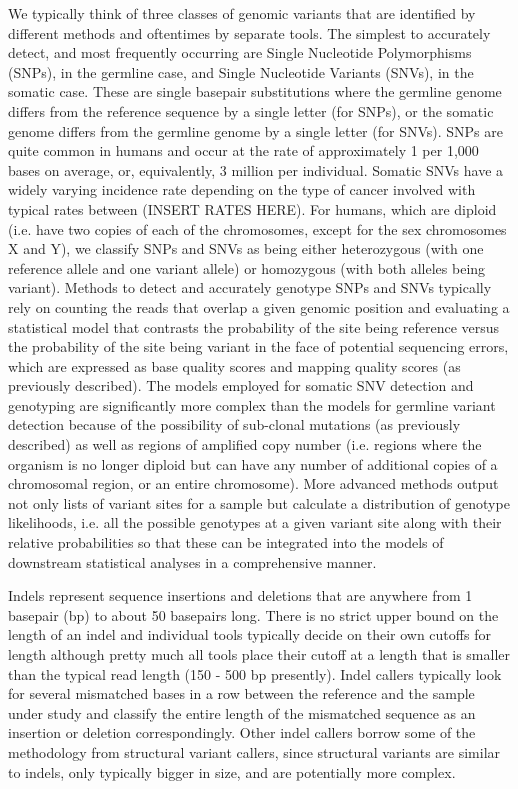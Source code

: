 We typically think of three classes of genomic variants that are identified by different methods and oftentimes by separate tools. The simplest to accurately detect, and most frequently occurring are Single Nucleotide Polymorphisms (SNPs), in the germline case, and Single Nucleotide Variants (SNVs), in the somatic case. These are single basepair substitutions where the germline genome differs from the reference sequence by a single letter (for SNPs), or the somatic genome differs from the germline genome by a single letter (for SNVs). SNPs are quite common in humans and occur at the rate of approximately 1 per 1,000 bases on average, or, equivalently, 3 million per individual. Somatic SNVs have a widely varying incidence rate depending on the type of cancer involved with typical rates between (INSERT RATES HERE). For humans, which are diploid (i.e. have two copies of each of the chromosomes, except for the sex chromosomes X and Y), we classify SNPs and SNVs as being either heterozygous (with one reference allele and one variant allele) or homozygous (with both alleles being variant). Methods to detect and accurately genotype SNPs and SNVs typically rely on counting the reads that overlap a given genomic position and evaluating a statistical model that contrasts the probability of the site being reference versus the probability of the site being variant in the face of potential sequencing errors, which are expressed as base quality scores and mapping quality scores (as previously described)\autocite{nielsen2011genotype}. The models employed for somatic SNV detection and genotyping are significantly more complex than the models for germline variant detection because of the possibility of sub-clonal mutations (as previously described) as well as regions of amplified copy number (i.e. regions where the organism is no longer diploid but can have any number of additional copies of a chromosomal region, or an entire chromosome). More advanced methods output not only lists of variant sites for a sample but calculate a distribution of genotype likelihoods, i.e. all the possible genotypes at a given variant site along with their relative probabilities so that these can be integrated into the models of downstream statistical analyses in a comprehensive manner\autocite{garrison2012haplotype}.

Indels represent sequence insertions and deletions that are anywhere from 1 basepair (bp) to about 50 basepairs long. There is no strict upper bound on the length of an indel and individual tools typically decide on their own cutoffs for length although pretty much all tools place their cutoff at a length that is smaller than the typical read length (150 - 500 bp presently). Indel callers typically look for several mismatched bases in a row between the reference and the sample under study and classify the entire length of the mismatched sequence as an insertion or deletion correspondingly. Other indel callers borrow some of the methodology from structural variant callers, since structural variants are similar to indels, only typically bigger in size, and are potentially more complex\autocite{hasan2015performance}.

